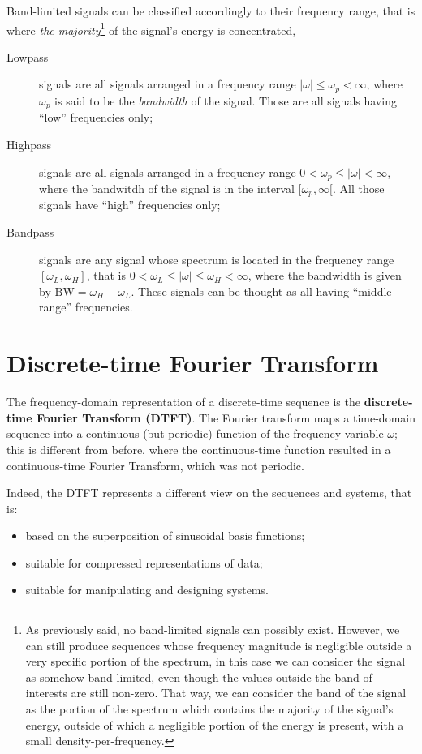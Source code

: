 \documentclass[\documentfontsize, twocolumn]{\classname}
\begin{document}
Band-limited signals can be classified accordingly to their frequency range,
that is where \emph{the majority}\footnote{As previously said, no band-limited
signals can possibly exist. However, we can still produce sequences whose
frequency magnitude is negligible outside a very specific portion of the
spectrum, in this case we can consider the signal as somehow band-limited, even
though the values outside the band of interests are still non-zero. That way,
we can consider the band of the signal as the portion of the spectrum which
contains the majority of the signal's energy, outside of which a negligible
portion of the energy is present, with a small density-per-frequency.} of the
signal's energy is concentrated,
\begin{description}
    \item[Lowpass] signals are all signals arranged in a frequency range $|\omega| \leq \omega_p < \infty$, where $\omega_p$ is said to be the \emph{bandwidth} of the signal. Those are all signals having ``low'' frequencies only;
    \item[Highpass] signals are all signals arranged in a frequency range $0 < \omega_p \leq |\omega| < \infty$, where the bandwitdh of the signal is in the interval $[\omega_p, \infty[$. All those signals have ``high'' frequencies only;
    \item[Bandpass] signals are any signal whose spectrum is located in the frequency range $[\omega_L, \omega_H]$, that is $0 < \omega_L \leq |\omega| \leq \omega_H < \infty$, where the bandwidth is given by $\mathrm{BW} = \omega_H - \omega_L$. These signals can be thought as all having ``middle-range'' frequencies.
\end{description}

\section{Discrete-time Fourier Transform}\label{sec:discreteTimeFourierTransform}
The frequency-domain representation of a discrete-time sequence is the
\textbf{discrete-time Fourier Transform (DTFT)}. The Fourier transform maps a
time-domain sequence into a continuous (but periodic) function of the frequency variable
$\omega$; this is different from before, where the continuous-time function
resulted in a continuous-time Fourier Transform, which was not periodic.

Indeed, the DTFT represents a different view on the sequences and systems, that is:
\begin{itemize}
    \item based on the superposition of sinusoidal basis functions;
    \item suitable for compressed representations of data;
    \item suitable for manipulating and designing systems.
\end{itemize}
\end{document}

